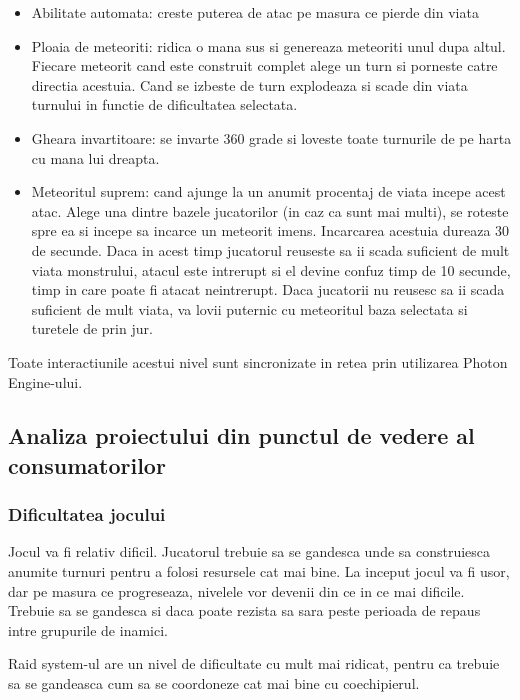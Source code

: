 \documentclass[12pt, a4paper]{article}
\begin{document}
	\begin{itemize}
		\item Abilitate automata: creste puterea de atac pe masura ce pierde din viata
		\item Ploaia de meteoriti: ridica o mana sus si genereaza meteoriti unul dupa altul. Fiecare meteorit cand este construit complet alege un turn si porneste catre directia acestuia. Cand se izbeste de turn explodeaza si scade din viata turnului in functie de dificultatea selectata.
		\item Gheara invartitoare: se invarte 360 grade si loveste toate turnurile de pe harta cu mana lui dreapta.
		\item Meteoritul suprem: cand ajunge la un anumit procentaj de viata incepe acest atac. Alege una dintre bazele jucatorilor (in caz ca sunt mai multi), se roteste spre ea si incepe sa incarce un meteorit imens. Incarcarea acestuia dureaza 30 de secunde. Daca in acest timp jucatorul reuseste sa ii scada suficient de mult viata monstrului, atacul este intrerupt si el devine confuz timp de 10 secunde, timp in care poate fi atacat neintrerupt. Daca jucatorii nu reusesc sa ii scada suficient de mult viata, va lovii puternic cu meteoritul baza selectata si turetele de prin jur.
	\end{itemize}

	Toate interactiunile acestui nivel sunt sincronizate in retea prin utilizarea Photon Engine-ului.
	
	
	\subsection{Analiza proiectului din punctul de vedere al consumatorilor}
	
	\subsubsection{Dificultatea jocului}
	
	Jocul va fi relativ dificil. Jucatorul trebuie sa se gandesca unde sa construiesca anumite turnuri pentru a folosi resursele cat mai bine. La inceput jocul va fi usor, dar pe masura ce progreseaza, nivelele vor devenii din ce in ce mai dificile. Trebuie sa se gandesca si daca poate rezista sa sara peste perioada de repaus intre grupurile de inamici.
	
	Raid system-ul are un nivel de dificultate cu mult mai ridicat, pentru ca trebuie sa se gandeasca cum sa se coordoneze cat mai bine cu coechipierul.
	
\end{document}
